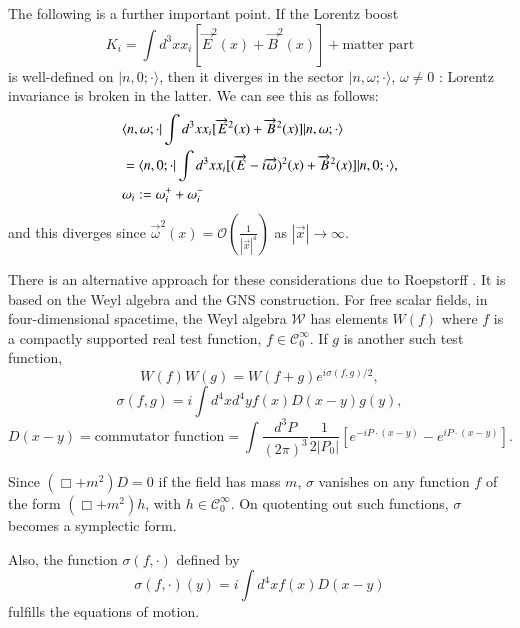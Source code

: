 The following is a further important point. If the Lorentz boost
\begin{equation}
K_{i}=\int d^{3}xx_{i}[\overrightarrow{E}^{2}(x)+\overrightarrow{B}^{2}(x)]+\text{matter part}\label{chap4-eq2.11}
\end{equation}
is well-defined on $|n, 0;\cdot\rangle$, then it diverges in the sector $|n,\omega;\cdot \rangle$, $\omega\neq 0$ : Lorentz invariance is broken in the latter. We can see this as follows:
\begin{align}
& \langle n,\omega;\cdot | \int d^{3}xx_{i}[\overrightarrow{E}^{2}(x)+\overrightarrow{B}^{2}(x)]|n,\omega;\cdot\rangle\notag\\
& =\langle n,0;\cdot |\int d^{3}xx_{i}[(\overrightarrow{E}-i\overrightarrow{\omega})^{2}(x)+\overrightarrow{B}^{2}(x)]|n,0;\cdot\rangle,\notag\\
&\omega_{i} := \omega^{+}_{i}+\omega^{-}_{i}\label{chap4-eq2.12}
\end{align}
and this diverges since $\overrightarrow{\omega}^{2}(x)=\mathcal{O}(\frac{1}{|\overrightarrow{x}|^{4}})$ as $|\overrightarrow{x}|\to \infty$.

There is an alternative approach for these considerations due to Roepstorff \cite{chap4-key6}. It is based on the Weyl algebra and the GNS construction. For free scalar fields, in four-dimensional spacetime, the Weyl algebra $\mathcal{W}$ has elements $W(f)$ where $f$ is a compactly supported real test function, $f\in \mathcal{C}^{\infty}_{0}$. If $g$ is another such test function,
\begin{equation}
W(f)W(g)=W(f+g)e^{i\sigma(f,g)/2},\label{chap4-eq2.13}
\end{equation}
\begin{equation}
\sigma (f,g)=i \int d^{4}xd^{4}yf(x)D(x-y)g(y),\label{chap4-eq2.14}
\end{equation}
\begin{equation}
D(x-y)=\text{commutator function} = \int \dfrac{d^{3}P}{(2\pi)^{3}}\dfrac{1}{2|P_{0}|}[e^{-iP\cdot (x-y)}-e^{iP\cdot (x-y)}].\label{chap4-eq2.15}
\end{equation}

Since $(\Box + m^2)D = 0$ if the field has mass $m$, $\sigma$ vanishes on any function $f$ of the form $(\Box + m^2)h$, with $h\in \mathcal{C}^{\infty}_{0}$. On quotenting out such functions, $\sigma$ becomes a symplectic form.

Also, the function $\sigma (f,\cdot)$ defined by
\begin{equation}
\sigma(f,\cdot)(y)=i\int d^{4}xf(x)D(x-y)\label{chap4-eq2.16}
\end{equation}
fulfills the equations of motion.

